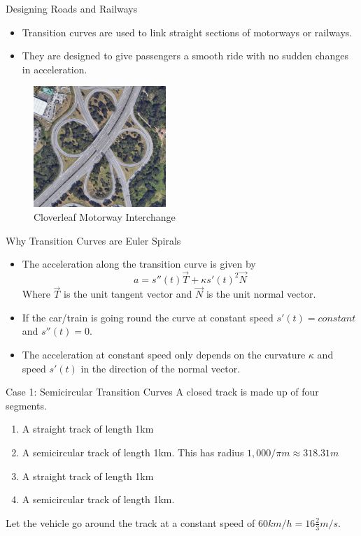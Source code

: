 \documentclass{beamer}
\begin{document}
\begin{frame}{Designing Roads and Railways}
	\begin{itemize}
		\item Transition curves are used to link straight sections of motorways or railways.
		\item They are designed to give passengers a smooth ride with no sudden changes in acceleration.

	\end{itemize}
		\begin{figure}
		\caption{Cloverleaf Motorway Interchange}
		\centering
		\includegraphics[width=50mm, scale=0.5]{cloverleaf_motorway.png}
	\end{figure}

\end{frame}

\begin{frame}{Why Transition Curves are Euler Spirals}
	\begin{itemize}
	\item The acceleration along the transition curve is given by
 	 \[
 	 a=s''(t) \vec{T}+\kappa s'(t)^2 \vec{N}
 	 \]
 	 Where $\vec{T}$ is the unit tangent vector and $\vec{N}$ is the unit normal vector.
 	 \item If the car/train is going round the curve at constant speed $s'(t)=constant$ and $s''(t)=0$.	
 	 \item The acceleration at constant speed only depends on the curvature $\kappa$ and speed $s'(t)$ in the direction of the normal vector.
	\end{itemize}
\end{frame}

\begin{frame}{Case 1: Semicircular Transition Curves}
	A closed  track is made up of four segments.
	\begin{enumerate}
		\item A straight track of length 1km
		\item A semicircular track of length 1km. This has radius $1,000 / \pi m \approx 318.31m$
		\item A straight track of length 1km
		\item A semicircular track of length 1km.
	\end{enumerate}
	Let the vehicle go around the track at a constant speed of $60 km/h = 16 \frac{2}{3} m/s$.
\end{frame}
\end{document}
